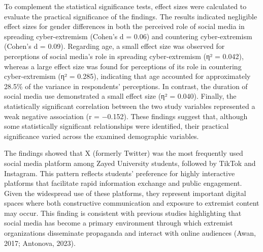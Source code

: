 \documentclass{NSP1}
\begin{document}
To complement the statistical significance tests, effect sizes were calculated to evaluate the practical significance of the findings. The results indicated negligible effect sizes for gender differences in both the perceived role of social media in spreading cyber-extremism (Cohen's d = 0.06) and countering cyber-extremism (Cohen's d = 0.09). Regarding age, a small effect size was observed for perceptions of social media's role in spreading cyber-extremism (η² = 0.042), whereas a large effect size was found for perceptions of its role in countering cyber-extremism (η² = 0.285), indicating that age accounted for approximately 28.5\% of the variance in respondents' perceptions. In contrast, the duration of social media use demonstrated a small effect size (η² = 0.040). Finally, the statistically significant correlation between the two study variables represented a weak negative association (r = −0.152). These findings suggest that, although some statistically significant relationships were identified, their practical significance varied across the examined demographic variables.

\par\medskip{}\smallskip

The findings showed that X (formerly Twitter) was the most frequently used social media platform among Zayed University students, followed by TikTok and Instagram. This pattern reflects students' preference for highly interactive platforms that facilitate rapid information exchange and public engagement. Given the widespread use of these platforms, they represent important digital spaces where both constructive communication and exposure to extremist content may occur. This finding is consistent with previous studies highlighting that social media has become a primary environment through which extremist organizations disseminate propaganda and interact with online audiences (Awan, 2017; Antonova, 2023).
\end{document}
